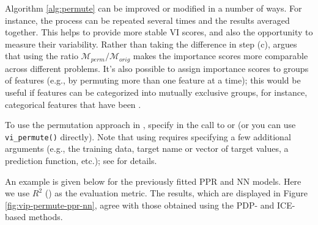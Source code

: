 Algorithm \ref{alg:permute} can be improved or modified in a number of
ways. For instance, the process can be repeated several times and the
results averaged together. This helps to provide more stable VI scores,
and also the opportunity to measure their variability. Rather than
taking the difference in step (c), \citet[sec. 5.5.4]{molnar-2019-iml}
argues that using the ratio \(\mathcal{M}_{perm} / \mathcal{M}_{orig}\)
makes the importance scores more comparable across different problems.
It's also possible to assign importance scores to groups of features
(e.g., by permuting more than one feature at a time); this would be
useful if features can be categorized into mutually exclusive groups,
for instance, categorical features that have been .

To use the permutation approach in , specify
 in the call to  or  (or
you can use \texttt{vi\_permute()} directly). Note that using
 requires specifying a few additional arguments
(e.g., the training data, target name or vector of target values, a
prediction function, etc.); see  for details.

An example is given below for the previously fitted PPR and NN models.
Here we use \(R^2\) () as the evaluation
metric. The results, which are displayed in Figure
\ref{fig:vip-permute-ppr-nn}, agree with those obtained using the PDP-
and ICE-based methods.

